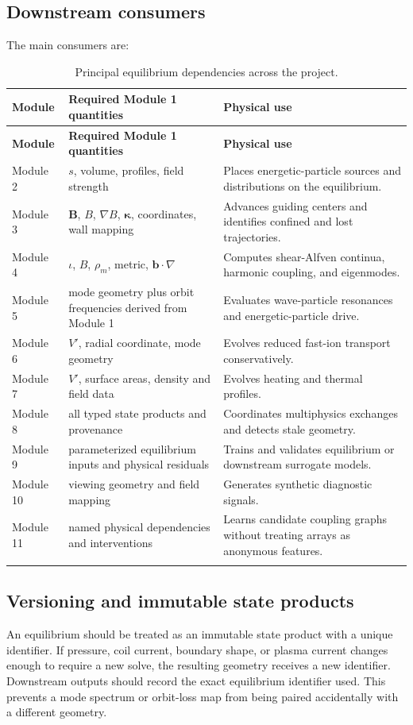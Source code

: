 \subsection{Downstream consumers}
The main consumers are:
\begin{longtable}{>{\RaggedRight\arraybackslash}p{} >{\RaggedRight\arraybackslash}p{} >{\RaggedRight\arraybackslash}p{}}
\toprule
\textbf{Module} & \textbf{Required Module 1 quantities} & \textbf{Physical use}\\
\midrule
\endfirsthead
\toprule
\textbf{Module} & \textbf{Required Module 1 quantities} & \textbf{Physical use}\\
\midrule
\endhead
Module 2 & $s$, volume, profiles, field strength & Places energetic-particle sources and distributions on the equilibrium.\\
Module 3 & $\mathbf B$, $B$, $\nabla B$, $\boldsymbol\kappa$, coordinates, wall mapping & Advances guiding centers and identifies confined and lost trajectories.\\
Module 4 & $\iota$, $B$, $\rho_m$, metric, $\mathbf b\cdot\nabla$ & Computes shear-Alfven continua, harmonic coupling, and eigenmodes.\\
Module 5 & mode geometry plus orbit frequencies derived from Module 1 & Evaluates wave-particle resonances and energetic-particle drive.\\
Module 6 & $V'$, radial coordinate, mode geometry & Evolves reduced fast-ion transport conservatively.\\
Module 7 & $V'$, surface areas, density and field data & Evolves heating and thermal profiles.\\
Module 8 & all typed state products and provenance & Coordinates multiphysics exchanges and detects stale geometry.\\
Module 9 & parameterized equilibrium inputs and physical residuals & Trains and validates equilibrium or downstream surrogate models.\\
Module 10 & viewing geometry and field mapping & Generates synthetic diagnostic signals.\\
Module 11 & named physical dependencies and interventions & Learns candidate coupling graphs without treating arrays as anonymous features.\\
\bottomrule
\caption{Principal equilibrium dependencies across the project.}
\label{tab:module1_consumers}
\end{longtable}

\subsection{Versioning and immutable state products}
An equilibrium should be treated as an immutable state product with a unique identifier. If pressure, coil current, boundary shape, or plasma current changes enough to require a new solve, the resulting geometry receives a new identifier. Downstream outputs should record the exact equilibrium identifier used. This prevents a mode spectrum or orbit-loss map from being paired accidentally with a different geometry.

